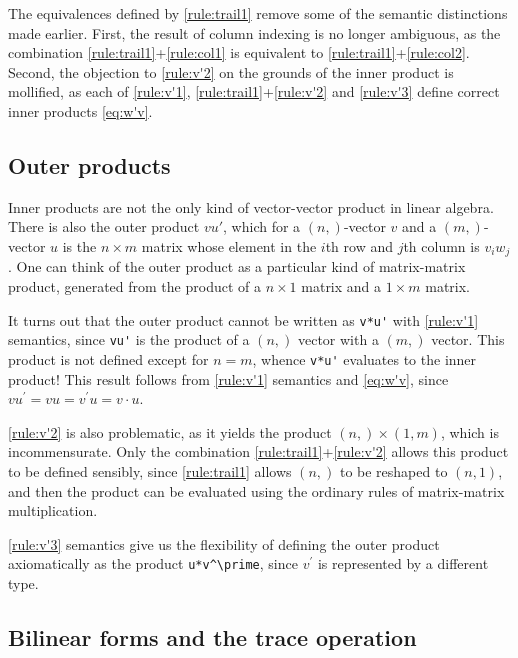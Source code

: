 The equivalences defined by \ref{rule:trail1} remove some of the semantic
distinctions made earlier. First, the result of column indexing is no longer
ambiguous, as the combination \ref{rule:trail1}+\ref{rule:col1} is equivalent
to \ref{rule:trail1}+\ref{rule:col2}. Second, the objection to \ref{rule:v'2}
on the grounds of the inner product is mollified, as each of
\ref{rule:v'1}, \ref{rule:trail1}+\ref{rule:v'2} and \ref{rule:v'3} define
correct inner products \eqref{eq:w'v}.



\subsection{Outer products}

Inner products are not the only kind of vector-vector product in linear
algebra. There is also the outer product $vu'$, which for a $(n,)$-vector $v$
and a $(m,)$-vector $u$ is the $n \times m$ matrix whose element in the $i$th
row and $j$th column is $v_i w_j$. One can think of the outer product as a
particular kind of matrix-matrix product, generated from the product of a $n
\times 1$ matrix and a $1 \times m$ matrix.

It turns out that the outer product cannot be written as \lstinline|v*u'| with
\ref{rule:v'1} semantics, since \lstinline|vu'| is the product of a $(n,)$
vector with a $(m,)$ vector. This product is not defined except for $n = m$,
whence \lstinline|v*u'| evaluates to the inner product! This result follows
from \ref{rule:v'1} semantics and \eqref{eq:w'v}, since $vu^\prime = vu =
v^\prime u = v \cdot u$.

\ref{rule:v'2} is also problematic, as it yields the product $(n,) \times (1,
m)$, which is incommensurate. Only the combination
\ref{rule:trail1}+\ref{rule:v'2} allows this product to be defined sensibly,
since \ref{rule:trail1} allows $(n,)$ to be reshaped to $(n,1)$, and then the
product can be evaluated using the ordinary rules of matrix-matrix
multiplication.

\ref{rule:v'3} semantics give us the flexibility of defining the outer product
axiomatically as the product \lstinline|u*v^\prime|, since $v^\prime$ is represented
by a different type.



\subsection{Bilinear forms and the trace operation}

